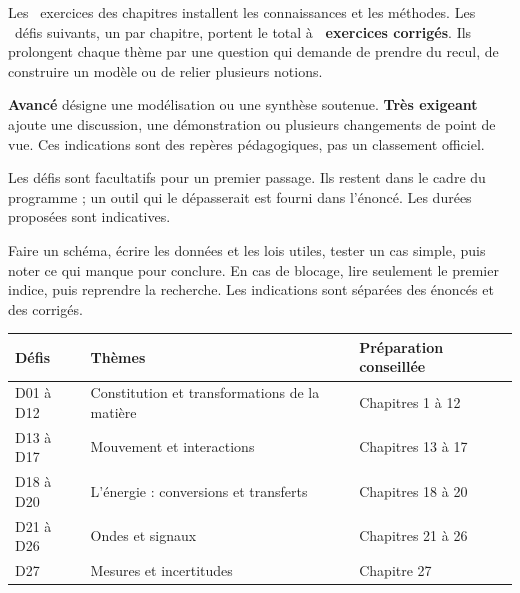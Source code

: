 \clearpage
\gdef\otChapNum{0}\pagestyle{otFront}
\label{defis-debut}
\fontsize{11}{16}\selectfont
Les \otNbExosChapitres\ exercices des chapitres installent les connaissances et les méthodes.
Les \otNbDefis\ défis suivants, un par chapitre, portent le total à \textbf{\otNbExosTotal\ exercices corrigés}.
Ils prolongent chaque thème par une question qui demande de prendre du recul, de construire un modèle
ou de relier plusieurs notions.\par\vspace{4mm}
\textbf{Avancé} désigne une modélisation ou une synthèse soutenue.
\textbf{Très exigeant} ajoute une discussion, une démonstration ou plusieurs changements de point de vue.
Ces indications sont des repères pédagogiques, pas un classement officiel.\par\vspace{4mm}
Les défis sont facultatifs pour un premier passage. Ils restent dans le cadre du programme ; un outil qui
le dépasserait est fourni dans l'énoncé. Les durées proposées sont indicatives.\par\vspace{5mm}
Faire un schéma, écrire les données et les lois utiles, tester un cas simple, puis noter ce qui manque
pour conclure. En cas de blocage, lire seulement le premier indice, puis reprendre la recherche.
Les indications sont séparées des énoncés et des corrigés.
\begin{center}\renewcommand{\arraystretch}{1.25}
\begin{tabular}{@{}lll@{}}\toprule
Défis & Thèmes & Préparation conseillée\\\midrule
D01 à D12 & Constitution et transformations de la matière & Chapitres 1 à 12\\
D13 à D17 & Mouvement et interactions & Chapitres 13 à 17\\
D18 à D20 & L'énergie : conversions et transferts & Chapitres 18 à 20\\
D21 à D26 & Ondes et signaux & Chapitres 21 à 26\\
D27 & Mesures et incertitudes & Chapitre 27\\\bottomrule
\end{tabular}\end{center}

